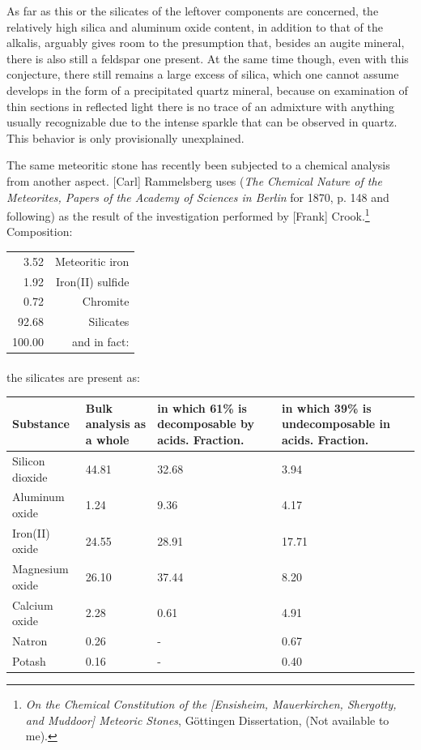 \documentclass[a4paper, 12pt, oneside]{article}
\begin{document}
As far as this or the silicates of the leftover components are concerned, the relatively high silica and aluminum oxide content, in addition to that of the alkalis, arguably gives room to the presumption that, besides an augite mineral, there is also still a feldspar one present. At the same time though, even with this conjecture, there still remains a large excess of silica, which one cannot assume develops in the form of a precipitated quartz mineral, because on examination of thin sections in reflected light there is no trace of an admixture with anything usually recognizable due to the intense sparkle that can be observed in quartz. This behavior is only provisionally unexplained.

The same meteoritic stone has recently been subjected to a chemical analysis from another aspect. [Carl] Rammelsberg uses (\emph{The Chemical Nature of the Meteorites, Papers of the Academy of Sciences in Berlin} for 1870, p. 148 and following) as the result of the investigation performed by [Frank] Crook.\footnote{\emph{On the Chemical Constitution of the [Ensisheim, Mauerkirchen, Shergotty, and Muddoor] Meteoric Stones}, Göttingen Dissertation, (Not available to me).} Composition:
\begin{center}
    \begin{tabular}{r r}
        3.52 & Meteoritic iron\\
        1.92 & Iron(II) sulfide\\
        0.72 & Chromite\\
        92.68 & Silicates\\
        100.00 & and in fact:\\
    \end{tabular}
\end{center}
\paragraph*{}
the silicates are present as:
\begin{center}
    \begin{tabular}{ |l|p{1.5cm}|p{3.2cm}|p{2.9cm}| }
        \hline
        Substance & Bulk analysis as a whole & in which 61\% is decomposable by acids. Fraction. & in which 39\% is undecomposable in acids. Fraction.\\\hline
        Silicon dioxide & 44.81 & 32.68 & 3.94\\\hline
        Aluminum oxide & 1.24 & 9.36 & 4.17\\\hline
        Iron(II) oxide & 24.55 & 28.91 & 17.71\\\hline
        Magnesium oxide & 26.10 & 37.44 & 8.20\\\hline
        Calcium oxide & 2.28 & 0.61 & 4.91\\\hline
        Natron & 0.26 & - & 0.67\\\hline
        Potash & 0.16 & - & 0.40\\
        \hline
    \end{tabular}
\end{center}
\end{document}
